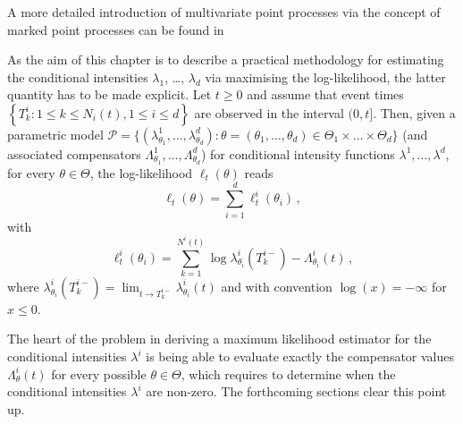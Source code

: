     \begin{remark}
    A more detailed introduction of multivariate point processes via the concept of marked point processes can be found in \cite[Chapter 6.4]{DaleyV1}
    \end{remark}

    As the aim of this chapter is to describe a practical methodology for estimating the conditional intensities \(\lambda_1\), \dots, \(\lambda_d\) via maximising the log-likelihood, the latter quantity has to be made explicit.
    Let \(t \ge 0\) and assume that event times
    $\left\{ T_k^i : 1 \le k \le N_i(t), 1 \le i \le d \right\}$
    are observed in the interval \((0, t]\).
    Then, given a parametric model $\mathcal{P} = \{(\lambda_{\theta_1}^1, \dots, \lambda_{\theta_d}^d)\colon \theta = (\theta_1, \dots, \theta_d) \in \Theta_1 \times \dots \times \Theta_d\}$ (and associated compensators \(\Lambda_{\theta_1}^1, \dots, \Lambda_{\theta_d}^d\)) for conditional intensity functions \(\lambda^1, \dots, \lambda^d\), for every \(\theta \in \Theta\), the log-likelihood $\ell_t(\theta)$ reads \cite[Proposition 7.3.III.]{DaleyV1}
    \begin{equation*}
      \ell_t(\theta) = \sum_{i=1}^{d}{\ell_t^i(\theta_i)}\,,\nonumber 
    \end{equation*}
    with
    \begin{equation}\label{eq:chap3_general_log_likelihood}
      \ell_t^{i}(\theta_i) = \sum_{k=1}^{N^i(t)}{\log{\lambda^i_{\theta_i}(T_k^{i-})}} - \Lambda_{\theta_i}^i(t)\,,
    \end{equation}
    where $\lambda^i_{\theta_i}(T_k^{i-}) = \lim_{t\to T_k^{i-}}{\lambda_{\theta_i}^i(t)}$ and with convention $\log{(x)} = -\infty$ for $x\leq 0$.

    The heart of the problem in deriving a maximum likelihood estimator for the conditional intensities \(\lambda^i\) is being able to evaluate exactly the compensator values \(\Lambda_\theta^i(t)\) for every possible \(\theta \in \Theta\), which requires to determine when the conditional intensities \(\lambda^i\) are non-zero.
    The forthcoming sections clear this point up.


